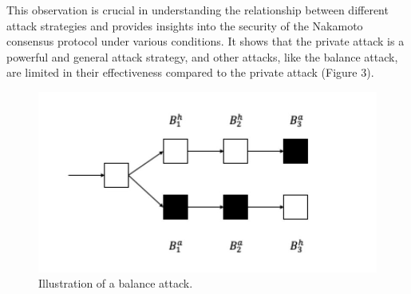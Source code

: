 This observation is crucial in understanding the relationship between different attack strategies and provides insights into the security of the Nakamoto consensus protocol under various conditions. It shows that the private attack is a powerful and general attack strategy, and other attacks, like the balance attack, are limited in their effectiveness compared to the private attack (Figure 3). 
\begin{figure}[h!]
	\centering
	\includegraphics[width=0.6\linewidth]{Fig/06/F3}
	\caption{Illustration of a balance attack.}
	\label{fig:f1}
\end{figure}
